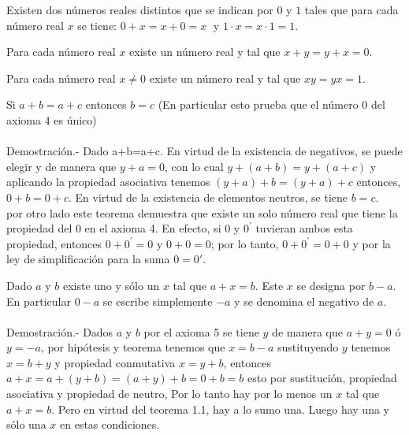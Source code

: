 \begin{axioma} Existen dos números reales distintos que se indican por $0$ y $1$ tales que para cada número real $x$ se tiene:
$0+x=x+0=x \;$ y $1\cdot x = x\cdot 1 = 1$. \\
\end{axioma}

\begin{axioma} Para cada número real $x$ existe un número real y tal que $x+y=y+x=0$. \\
\end{axioma}

\begin{axioma} Para cada número real $x\neq 0$ existe un número real y tal que $xy=yx=1$. \\
\end{axioma}

\begin{teo}
Si $a+b=a+c$ entonces $b=c$ (En particular esto prueba que el número 0 del axioma 4 es único)\\\\
Demostración.- \;
Dado a+b=a+c. En virtud de la existencia de negativos, se puede elegir y de manera que $y+a=0$, con lo cual $y+(a+b)=y+(a+c)$ y aplicando la propiedad asociativa tenemos $(y+a)+b=(y+a)+c$ entonces, $0+b=0+c$. En virtud de la existencia de elementos neutros, se tiene $b=c$.\\
por otro lado este teorema demuestra que existe un solo número real que tiene la propiedad del 0 en el axioma 4. En efecto, si $0$ y $0^{'}$ tuvieran ambos esta propiedad, entonces $0+0^{'}=0$ y $0+0=0$; por lo tanto, $0+0^{'}=0+0$ y por la ley de simplificación para la suma $0=0'$.
\end{teo}

\begin{teo}
Dado $a$ y $b$ existe uno y sólo un $x$ tal que $a+x=b$. Este $x$ se designa por $b-a$. En particular $0-a$ se escribe simplemente $-a$ y se denomina el negativo de $a$.\\\\
Demostración.- \;
Dados $a$ y $b$ por el axioma 5 se tiene $y$ de manera que $a + y = 0$ ó $y=-a$, por hipótesis y teorema tenemos que $x=b-a$ sustituyendo $y$ tenemos $x=b+y$ y propiedad conmutativa $x=y+b$, entonces $a+x=a+(y+b)=(a+y)+b=0+b=b$ esto por sustitución, propiedad asociativa y propiedad de neutro, Por lo tanto hay por lo menos un $x$ tal que $a+x=b$. Pero en virtud del teorema 1.1, hay a lo sumo una. Luego hay una y sólo una $x$ en estas condiciones.
\end{teo}

